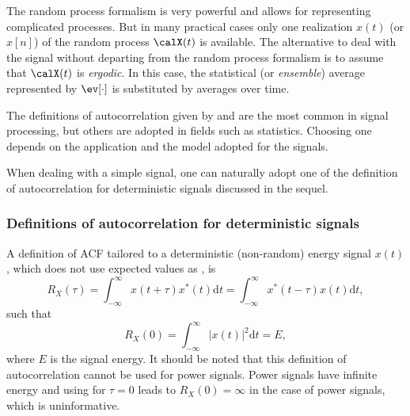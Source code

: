 The random process formalism is very powerful and allows for representing complicated processes. But in many practical cases only one realization $x(t)$ (or $x[n]$) of the random process $\calX(t)$ is available. The alternative to deal with the signal without departing from the random process formalism is to assume that $\calX(t)$ is \emph{ergodic}. In this case, the statistical (or \emph{ensemble}) average represented by $\ev[ \cdot]$ is substituted by averages over time. 

The definitions of autocorrelation given by  and  are the most common in signal processing, but others are adopted in fields such as statistics. Choosing one depends on the application and the model adopted for the signals.


When dealing with a simple signal, one can naturally adopt one of the definition of autocorrelation for deterministic signals discussed in the sequel.

\subsubsection{Definitions of autocorrelation for deterministic signals}


A definition of ACF tailored to a deterministic (non-random) energy signal $x(t)$, which does not use expected values as , is
\begin{equation}
R_{X}(\tau)  = \int_{-\infty}^{\infty} {x(t+\tau)x^*(t)} \textrm{d}t = \int_{-\infty}^{\infty} {x^*(t-\tau)x(t)} \textrm{d}t,
\label{eq:autocorrelation_energy}
\end{equation}
such that 
\begin{equation}
R_X(0)= \int_{-\infty}^{\infty} |x(t)|^2 \textrm{d}t = E,
\label{eq:autocorrelationOriginIsEnergy}
\end{equation}
where $E$ is the signal energy.
It should be noted that this definition of autocorrelation cannot be used for power signals. Power signals have infinite energy and using  for $\tau=0$ leads to $R_X(0)=\infty$ in the case of power signals, which is uninformative.

